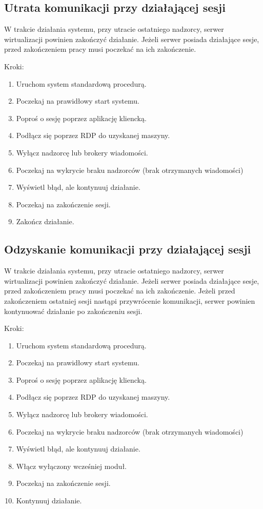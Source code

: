\documentclass[../analiza-rozwiazania.tex]{subfiles}
\begin{document}
\subsection{Utrata komunikacji przy działającej sesji}
W trakcie działania systemu, przy utracie ostatniego nadzorcy, serwer wirtualizacji powinien zakończyć działanie. Jeżeli serwer posiada działające sesje, przed zakończeniem pracy musi poczekać na ich zakończenie.

Kroki:
\begin{enumerate}
  \item Uruchom system standardową procedurą.
  \item Poczekaj na prawidłowy start systemu.
  \item Poproś o sesję poprzez aplikację kliencką.
  \item Podłącz się poprzez RDP do uzyskanej maszyny.
  \item Wyłącz nadzorcę lub brokery wiadomości.
  \item Poczekaj na wykrycie braku nadzorców (brak otrzymanych wiadomości)
  \item Wyświetl błąd, ale kontynuuj działanie.
  \item Poczekaj na zakończenie sesji.
  \item Zakończ działanie.
\end{enumerate}

\subsection{Odzyskanie komunikacji przy działającej sesji}
W trakcie działania systemu, przy utracie ostatniego nadzorcy, serwer wirtualizacji powinien zakończyć działanie. Jeżeli serwer posiada działające sesje, przed zakończeniem pracy musi poczekać na ich zakończenie. Jeżeli przed zakończeniem ostatniej sesji nastąpi przywrócenie komunikacji, serwer powinien kontynuować działanie po zakończeniu sesji.

Kroki:
\begin{enumerate}
  \item Uruchom system standardową procedurą.
  \item Poczekaj na prawidłowy start systemu.
  \item Poproś o sesję poprzez aplikację kliencką.
  \item Podłącz się poprzez RDP do uzyskanej maszyny.
  \item Wyłącz nadzorcę lub brokery wiadomości.
  \item Poczekaj na wykrycie braku nadzorców (brak otrzymanych wiadomości)
  \item Wyświetl błąd, ale kontynuuj działanie.
  \item Włącz wyłączony wcześniej moduł.
  \item Poczekaj na zakończenie sesji.
  \item Kontynuuj działanie.
\end{enumerate}
\end{document}
